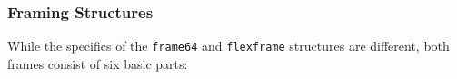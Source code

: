 \subsubsection{Framing Structures}
\label{module:framing:frames:structures}
While the specifics of the {\tt frame64} and {\tt flexframe} structures
are different,
both frames consist of six basic parts:
%
%
